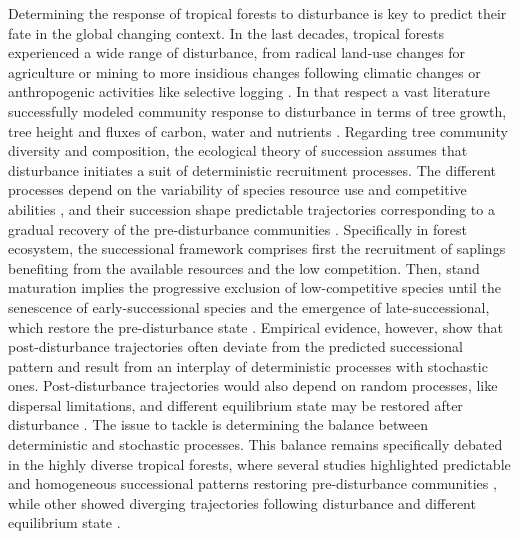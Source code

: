 \documentclass[fleqn,10pt]{ArtEcoFoG} %
\begin{document}
Determining the response of tropical forests to disturbance is key to
predict their fate in the global changing context. In the last decades,
tropical forests experienced a wide range of disturbance, from radical
land-use changes for agriculture or mining
\citep{Dezecache2017a, Dezecache2017b} to more insidious changes
following climatic changes or anthropogenic activities like selective
logging \citep{Baraloto2012a, Aubry-Kientz2015}. In that respect a vast
literature successfully modeled community response to disturbance in
terms of tree growth, tree height and fluxes of carbon, water and
nutrients
\citep{Gourlet-Fleury2000, Putz2012, Piponiot2016, Rutishauser2016}.
Regarding tree community diversity and composition, the ecological
theory of succession assumes that disturbance initiates a suit of
deterministic recruitment processes. The different processes depend on
the variability of species resource use and competitive abilities
\citep{Clements1916, Meiners2015}, and their succession shape
predictable trajectories corresponding to a gradual recovery of the
pre-disturbance communities \citep{Chesson2000, Rees2001, Adler2007}.
Specifically in forest ecosystem, the successional framework comprises
first the recruitment of saplings benefiting from the available
resources and the low competition. Then, stand maturation implies the
progressive exclusion of low-competitive species until the senescence of
early-successional species and the emergence of late-successional, which
restore the pre-disturbance state \citep{Denslow2000}. Empirical
evidence, however, show that post-disturbance trajectories often deviate
from the predicted successional pattern and result from an interplay of
deterministic processes with stochastic ones. Post-disturbance
trajectories would also depend on random processes, like dispersal
limitations, and different equilibrium state may be restored after
disturbance \citep{Hubbell2001, Chave2004, Norden2015}. The issue to
tackle is determining the balance between deterministic and stochastic
processes. This balance remains specifically debated in the highly
diverse tropical forests, where several studies highlighted predictable
and homogeneous successional patterns restoring pre-disturbance
communities \citep{Norden2009, Letcher2015}, while other showed
diverging trajectories following disturbance and different equilibrium
state \citep{Longworth2014, Norden2015}.
\end{document}
